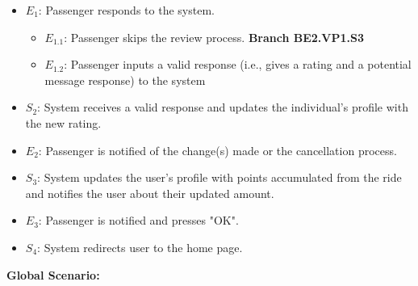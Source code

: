 \documentclass[]{article}
\begin{document}
\begin{enumerate}[{\bf BE1.}]
\begin{enumerate}[{\bf VP1.}]
{{\begin{itemize}
\begin{itemize}
						\item[]$S_{1.2}$: System successfully authenticates the passenger and displays a list of applicable (previous carpool partners) passengers to leave a review/rating (/5) for.
					\end{itemize}
					\item {$E_{1}$:} Passenger responds to the system. \begin{itemize}
						\item[] $E_{1.1}$: Passenger skips the review process. \textbf{\color{red}\textlangle Branch BE2.VP1.S3 \textrangle}
						\item[]$E_{1.2}$: Passenger inputs a valid response (i.e., gives a rating and a potential message response) to the system
					\end{itemize}
					\item {$S_{2}$:} System receives a valid response and updates the individual's profile with the new rating.
					\item {$E_{2}$:} Passenger is notified of the change(s) made or the cancellation process.
					\item {$S_{3}$:} System updates the user's profile with points accumulated from the ride and notifies the user about their updated amount.
					\item {$E_{3}$:} Passenger is notified and presses "OK".
					\item {$S_{4}$:} System redirects user to the home page.
				\end{itemize}
			}
		}
	\end{enumerate}
	{\bf Global Scenario:}\\
	\noindent{}
\end{enumerate}
\end{document}

